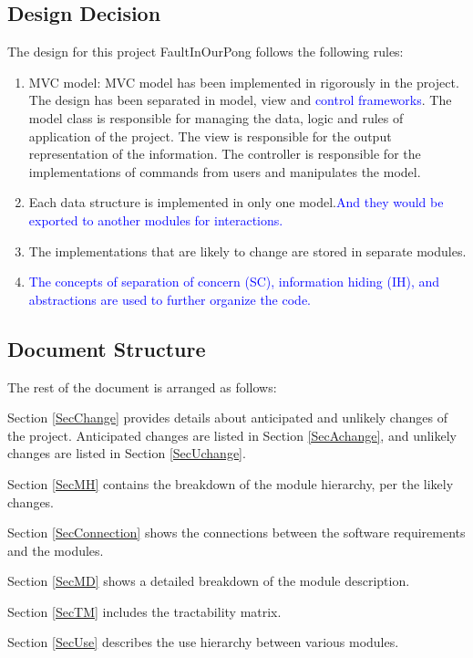 \documentclass[12pt,letterpaper]{article}
\begin{document}
	\subsection {Design Decision}
	The design for this project FaultInOurPong follows the following rules:
\begin{enumerate}
	\item MVC model: MVC model has been implemented in rigorously in the project. The design has been separated in model, view and \textcolor{blue}{control frameworks}. The model class is responsible for managing the data, logic and rules of application of the project. The view is responsible for the output representation of the information. The controller is responsible for the implementations of commands from users and manipulates the model.
	\item Each data structure is implemented in only one model.\textcolor{blue}{And they would be exported to another modules for interactions.}
	\item The implementations that are likely to change are stored in separate modules.
	\item \textcolor{blue}{The concepts of separation of concern (SC), information hiding (IH), and abstractions are used to further organize the code.}
\end{enumerate}


	\subsection{Document Structure}	
	 
	The rest of the document is arranged as follows: 

	Section \ref{SecChange} provides details about anticipated and unlikely changes of the project. Anticipated changes are listed in Section \ref{SecAchange}, and unlikely changes are listed in Section \ref{SecUchange}.

	Section \ref{SecMH} contains the breakdown of the module hierarchy, per the likely changes. 

	Section \ref{SecConnection} shows the connections between the software requirements and the modules. 

	Section \ref{SecMD} shows a detailed breakdown of the module description. 

	Section \ref{SecTM} includes the tractability matrix. 

	Section \ref{SecUse} describes the use hierarchy between various modules. 
\end{document}
